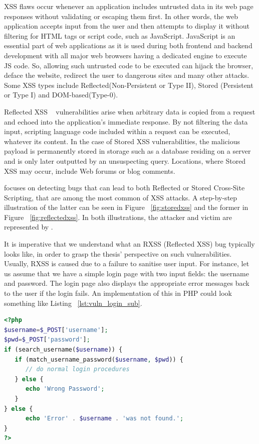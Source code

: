 XSS flaws occur whenever an application includes untrusted data in its web page responses without validating or escaping them first. In other words, the web application accepts input from the user and then attempts to display it without filtering for HTML tags or script code, such as JavaScript. JavaScript is an essential part of web applications as it is used during both frontend and backend development with all major web browsers having a dedicated engine to execute JS code. So, allowing such untrusted code to be executed can hijack the browser, deface the website, redirect the user to dangerous sites and many other attacks. Some XSS types include Reflected(Non-Persistent or Type II), Stored (Persistent or Type I) and DOM-based(Type-0).

Reflected XSS ~\cite{rxss_def} vulnerabilities arise when arbitrary data is copied from a request and echoed into the application's immediate response. By not filtering the data input, scripting language code included within a request can be executed, whatever its content. In the case of Stored XSS vulnerabilities, the malicious payload is permanently stored in storage such as a database residing on a server and is only later outputted by an unsuspecting query. Locations, where Stored XSS may occur, include Web forums or blog comments. 

\pname{} focuses on detecting bugs that can lead to both Reflected or Stored Cross-Site Scripting, that are among the most common of XSS attacks. A step-by-step illustration of the latter can be seen in Figure ~\ref{fig:storedxss} and the former in Figure ~\ref{fig:reflectedxss}. In both illustrations, the attacker and victim are represented by \pname{}.

It is imperative that we understand what an RXSS (Reflected XSS) bug typically looks like, in order to grasp the thesis' perspective on such vulnerabilities. Usually, RXSS is caused due to a failure to sanitise user input. For instance, let us assume that we have a simple login page with two input fields: the username and password. The login page also displays the appropriate error messages back to the user if the login fails. An implementation of this in PHP could look something like Listing ~\ref{lst:vuln_login_sub}.

\begin{lstlisting}[aboveskip=\baselineskip, showstringspaces=false, frame=single, language=PHP, caption={\textit{Vulnerable login form}}, numberstyle=\color{gray}, numbersep=5pt, label={lst:vuln_login_sub}]
<?php
$username=$_POST['username'];
$pwd=$_POST['password'];
if (search_username($username)) {
   if (match_username_password($username, $pwd)) {
      // do normal login procedures
   } else {
      echo 'Wrong Password';
   }
} else {
      echo 'Error' . $username . 'was not found.';
}
?>
\end{lstlisting}

